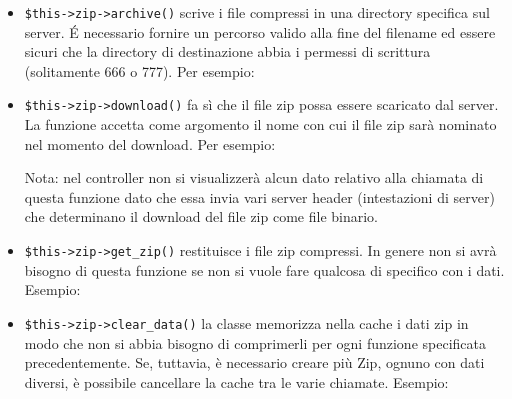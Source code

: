 \begin{itemize}

Questo codice crea un archivio zip con la cartella ``directory'' e tutte le relative sottocartelle. Non sarà però incluso il percorso radice, ovvero 

\item \verb|$this->zip->archive()| scrive i file compressi in una directory specifica sul server. \'E necessario fornire un percorso valido alla fine del filename ed essere sicuri che la directory di destinazione abbia i permessi di scrittura (solitamente 666 o 777). Per esempio:


\item \verb|$this->zip->download()| fa sì che il file zip possa essere scaricato dal server. La funzione accetta come argomento il nome con cui il file zip sarà nominato nel momento del download. Per esempio:


Nota: nel controller non si visualizzerà alcun dato relativo alla chiamata di questa funzione dato che essa invia vari server header (intestazioni di server) che determinano il download del file zip come file binario.

\item \verb|$this->zip->get_zip()| restituisce i file zip compressi. In genere non si avrà bisogno di questa funzione se non si vuole fare qualcosa di specifico con i dati. Esempio:


\item \verb|$this->zip->clear_data()| la classe memorizza nella cache i dati zip in modo che non si abbia bisogno di comprimerli per ogni funzione specificata precedentemente. Se, tuttavia, è necessario creare più Zip, ognuno con dati diversi, è possibile cancellare la cache tra le varie chiamate. Esempio:


\end{itemize}
